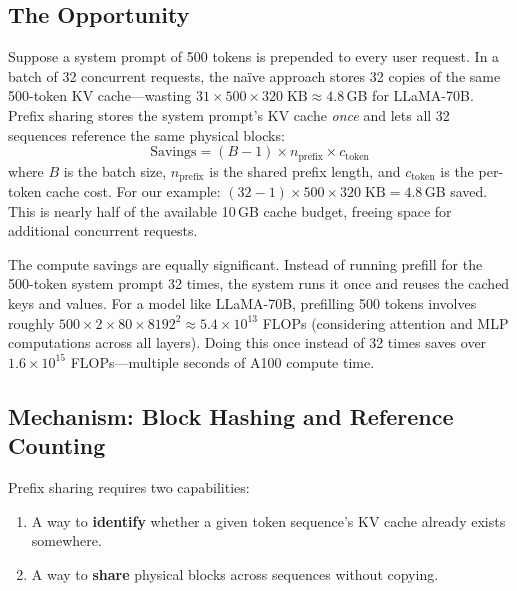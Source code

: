 \subsection{The Opportunity}

Suppose a system prompt of 500 tokens is prepended to every user request. In a batch of 32 concurrent requests, the na\"ive approach stores 32 copies of the same 500-token KV cache---wasting $31 \times 500 \times 320\;\text{KB} \approx 4.8$\,GB for LLaMA-70B. Prefix sharing stores the system prompt's KV cache \emph{once} and lets all 32 sequences reference the same physical blocks:
\begin{equation}
\text{Savings} = (B - 1) \times n_{\text{prefix}} \times c_{\text{token}}
\end{equation}
where $B$ is the batch size, $n_{\text{prefix}}$ is the shared prefix length, and $c_{\text{token}}$ is the per-token cache cost. For our example: $(32 - 1) \times 500 \times 320\;\text{KB} = 4.8$\,GB saved. This is nearly half of the available 10\,GB cache budget, freeing space for additional concurrent requests.

The compute savings are equally significant. Instead of running prefill for the 500-token system prompt 32 times, the system runs it once and reuses the cached keys and values. For a model like LLaMA-70B, prefilling 500 tokens involves roughly $500 \times 2 \times 80 \times 8192^2 \approx 5.4 \times 10^{13}$ FLOPs (considering attention and MLP computations across all layers). Doing this once instead of 32 times saves over $1.6 \times 10^{15}$ FLOPs---multiple seconds of A100 compute time.

\subsection{Mechanism: Block Hashing and Reference Counting}

Prefix sharing requires two capabilities:
\begin{enumerate}
  \item A way to \textbf{identify} whether a given token sequence's KV cache already exists somewhere.
  \item A way to \textbf{share} physical blocks across sequences without copying.
\end{enumerate}

